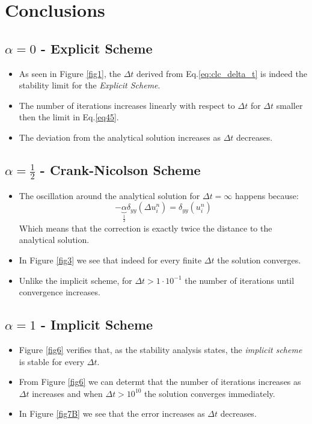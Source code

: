 \documentclass[11pt, a4paper]{article}
\begin{document}
\section{Conclusions}
\subsection{$\alpha = 0$ - Explicit Scheme}
\begin{itemize}
    \item As seen in Figure \ref{fig1}, the $\Delta t$ derived from Eq.\ref{eq:clc_delta_t} is indeed the stability limit for the \emph{Explicit Scheme}.
    \item The number of iterations increases linearly with respect to $\Delta t$ for $\Delta t$ smaller then the limit in Eq.\ref{eq45}.
    \item The deviation from the analytical solution increases as $\Delta t$ decreases.
\end{itemize}
\subsection{$\alpha = \frac{1}{2}$ - Crank-Nicolson Scheme}
\begin{itemize}
    \item The oscillation around the analytical solution for $\Delta t= \infty$ happens because:
    \begin{equation}
         - \underbrace{\alpha}_\frac{1}{2}\delta_{yy}\left(\Delta u^n_i\right) = \delta_{yy}\left(u^n_i\right)
    \end{equation}
    Which means that the correction is exactly twice the distance to the analytical solution.
    \item In Figure \ref{fig3} we see that indeed for every finite $\Delta t$ the solution converges.
    \item Unlike the implicit scheme, for $\Delta t > 1\cdot10^{-1}$ the number of iterations until convergence increases.
\end{itemize}
\subsection{$\alpha = 1$ - Implicit Scheme}
\begin{itemize}
    \item Figure \ref{fig6} verifies that, as the stability analysis states, the \emph{implicit scheme} is stable for every $\Delta t$.
    \item From Figure \ref{fig6} we can determt that the number of iterations increases as $\Delta t$ increases and when $\Delta t > 10^{10}$ the solution converges immediately.
    \item In Figure \ref{fig7B} we see that the error increases as $\Delta t$ decreases.
\end{itemize}
\end{document}
